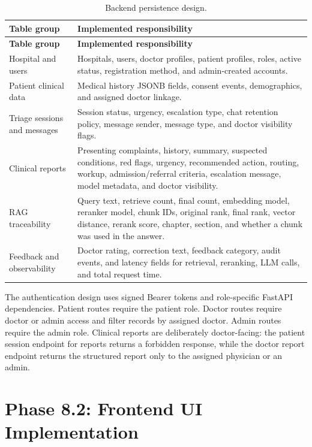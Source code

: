 \begin{longtable}{p{} p{}}
\caption{Backend persistence design.}
\label{tab:backend_persistence_design}\\
\toprule
\textbf{Table group} & \textbf{Implemented responsibility}\\
\midrule
\endfirsthead
\toprule
\textbf{Table group} & \textbf{Implemented responsibility}\\
\midrule
\endhead
Hospital and users & Hospitals, users, doctor profiles, patient profiles, roles, active status, registration method, and admin-created accounts.\\
Patient clinical data & Medical history JSONB fields, consent events, demographics, and assigned doctor linkage.\\
Triage sessions and messages & Session status, urgency, escalation type, chat retention policy, message sender, message type, and doctor visibility flags.\\
Clinical reports & Presenting complaints, history, summary, suspected conditions, red flags, urgency, recommended action, routing, workup, admission/referral criteria, escalation message, model metadata, and doctor visibility.\\
RAG traceability & Query text, retrieve count, final count, embedding model, reranker model, chunk IDs, original rank, final rank, vector distance, rerank score, chapter, section, and whether a chunk was used in the answer.\\
Feedback and observability & Doctor rating, correction text, feedback category, audit events, and latency fields for retrieval, reranking, LLM calls, and total request time.\\
\bottomrule
\end{longtable}

The authentication design uses signed Bearer tokens and role-specific FastAPI dependencies. Patient routes require the patient role. Doctor routes require doctor or admin access and filter records by assigned doctor. Admin routes require the admin role. Clinical reports are deliberately doctor-facing: the patient session endpoint for reports returns a forbidden response, while the doctor report endpoint returns the structured report only to the assigned physician or an admin.

\section{Phase 8.2: Frontend UI Implementation}

